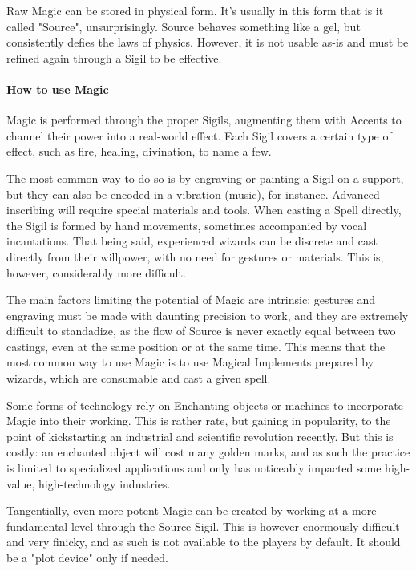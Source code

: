 Raw Magic can be stored in physical form. It's usually in this form that is it called "Source", unsurprisingly. Source behaves something like a gel, but consistently defies the laws of physics. However, it is not usable as-is and must be refined again through a Sigil to be effective.



\paragraph{How to use Magic}

Magic is performed through the proper Sigils, augmenting them with Accents to channel their power into a real-world effect. Each Sigil covers a certain type of effect, such as fire, healing, divination, to name a few.

The most common way to do so is by engraving or painting a Sigil on a support, but they can also be encoded in a vibration (music), for instance. Advanced inscribing will require special materials and tools. When casting a Spell directly, the Sigil is formed by hand movements, sometimes accompanied by vocal incantations. That being said, experienced wizards can be discrete and cast directly from their willpower, with no need for gestures or materials. This is, however, considerably more difficult. 

The main factors limiting the potential of Magic are intrinsic: gestures and engraving must be made with daunting precision to work, and they are extremely difficult to standadize, as the flow of Source is never exactly equal between two castings, even at the same position or at the same time. This means that the most common way to use Magic is to use Magical Implements prepared by wizards, which are consumable and cast a given spell.

Some forms of technology rely on Enchanting objects or machines to incorporate Magic into their working. This is rather rate, but gaining in popularity, to the point of kickstarting an industrial and scientific revolution recently. But this is costly: an enchanted object will cost many golden marks, and as such the practice is limited to specialized applications and only has noticeably impacted some high-value, high-technology industries.

Tangentially, even more potent Magic can be created by working at a more fundamental level through the Source Sigil. This is however enormously difficult and very finicky, and as such is not available to the players by default. It should be a "plot device" only if needed.

